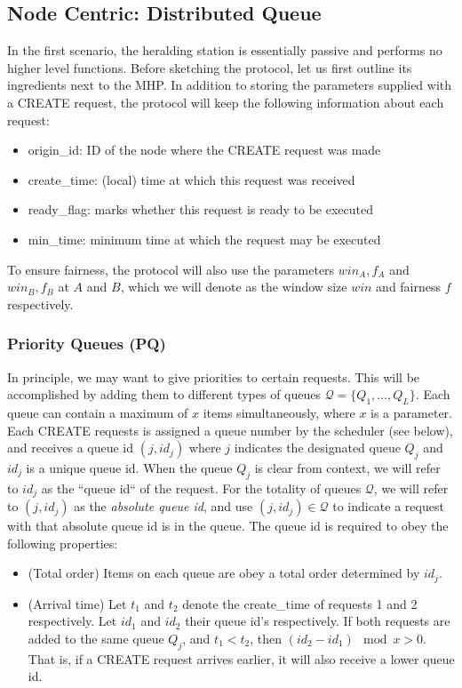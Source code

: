 \documentclass{article}
\begin{document}
\subsection{Node Centric: Distributed Queue}
In the first scenario, the heralding station is essentially passive and performs no higher level functions.
Before sketching the protocol, let us first outline its ingredients next to the MHP.
In addition to storing the parameters supplied with a CREATE request, the protocol will keep the following information about each request:
\begin{itemize}
\item origin\_id: ID of the node where the CREATE request was made
\item create\_time: (local) time at which this request was received
\item ready\_flag: marks whether this request is ready to be executed
\item min\_time: minimum time at which the request may be executed
\end{itemize}
To ensure fairness, the protocol will also use the parameters $win_A, f_A$ and $win_B,f_B$ at $A$ and $B$, which we will denote as the window size $win$ and
fairness $f$ respectively.

\subsubsection{Priority Queues (PQ)}
In principle, we may want to give priorities to certain requests. This will be accomplished by adding them to different types of queues $\mathcal{Q} =
\{Q_1,\ldots,Q_L\}$.
Each queue can contain a maximum of $x$ items simultaneously, where $x$ is a parameter.
Each CREATE requests is assigned a queue number by the scheduler (see below), and receives a queue id $(j, id_j)$ where $j$ indicates the designated queue $Q_j$
and $id_j$ is a unique queue id.
When the queue $Q_j$ is clear from context, we will refer to $id_j$ as the ``queue id`` of the request. For the totality of queues $\mathcal{Q}$, we will refer to $(j, id_j)$ as the \emph{absolute queue id}, and use
$(j,id_j) \in \mathcal{Q}$ to indicate a request with that absolute queue id is in the queue.
The queue id is required to obey the following properties:
\begin{itemize}
\item (Total order) Items on each queue are obey a total order determined by $id_j$.
\item (Arrival time) Let $t_1$ and $t_2$ denote the create\_time of requests 1 and 2 respectively. Let $id_1$ and $id_2$ their queue id's respectively.
If both requests are added to the same queue $Q_j$, and $t_1 < t_2$, then $(id_2 - id_1) \mod x > 0$. That is, if a CREATE request arrives earlier, it will also
receive a lower queue id.
\end{itemize}
\end{document}
